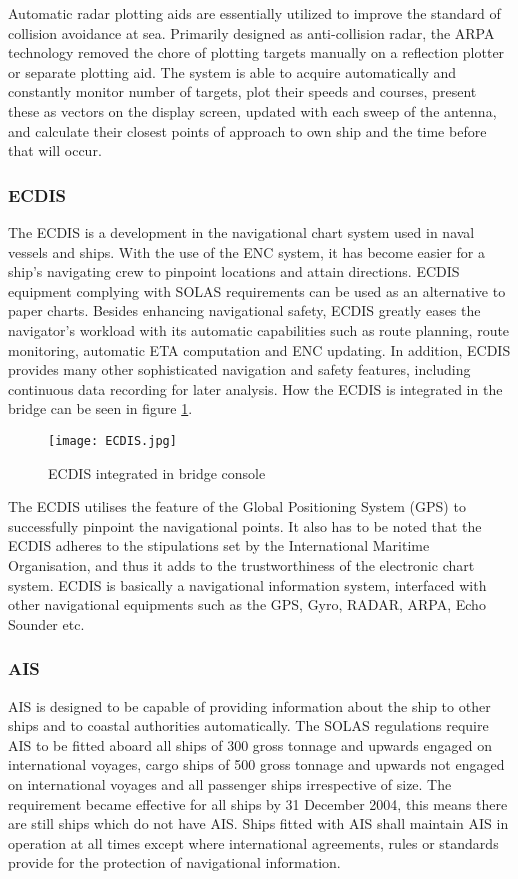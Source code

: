 Automatic radar plotting aids are essentially utilized to improve the standard of collision avoidance at sea. Primarily designed as anti-collision radar, the ARPA technology removed the chore of plotting targets manually on a reflection plotter or separate plotting aid. The system is able to acquire automatically and constantly monitor number of targets, plot their speeds and courses, present these as vectors on the display screen, updated with each sweep of the antenna, and calculate their closest points of approach to own ship and the time before that will occur.

\subsubsection{\acf{ECDIS}}
The \acf{ECDIS} is a development in the navigational chart system used in naval vessels and ships. With the use of the \acf{ENC} system, it has become easier for a ship’s navigating crew to pinpoint locations and attain directions. ECDIS equipment complying with SOLAS requirements can be used as an alternative to paper charts. Besides enhancing navigational safety, ECDIS greatly eases the navigator’s workload with its automatic capabilities such as route planning, route monitoring, automatic ETA computation and ENC updating. In addition, ECDIS provides many other sophisticated navigation and safety features, including continuous data recording for later analysis. How the ECDIS is integrated in the bridge can be seen in figure \ref{fig:ECDIS}.

\begin{figure}[H]
	\centering
	\texttt{[image: ECDIS.jpg]}
	\caption{\acf{ECDIS} integrated in bridge console}
	\label{fig:ECDIS}
\end{figure}

The ECDIS utilises the feature of the Global Positioning System (GPS) to successfully pinpoint the navigational points. It also has to be noted that the ECDIS adheres to the stipulations set by the International Maritime Organisation, and thus it adds to the trustworthiness of the electronic chart system. ECDIS is basically a navigational information system, interfaced with other navigational equipments such as the GPS, Gyro, RADAR, ARPA, Echo Sounder etc.

\subsubsection{\acf{AIS}}
\ac{AIS} is designed to be capable of providing information about the ship to other ships and to coastal authorities automatically. The \ac{SOLAS} regulations require \ac{AIS} to be fitted aboard all ships of 300 gross tonnage and upwards engaged on international voyages, cargo ships of 500 gross tonnage and upwards not engaged on international voyages and all passenger ships irrespective of size. The requirement became effective for all ships by 31 December 2004, this means there are still ships which do not have \ac{AIS}. Ships fitted with \ac{AIS} shall maintain \ac{AIS} in operation at all times except where international agreements, rules or standards provide for the protection of navigational information.

